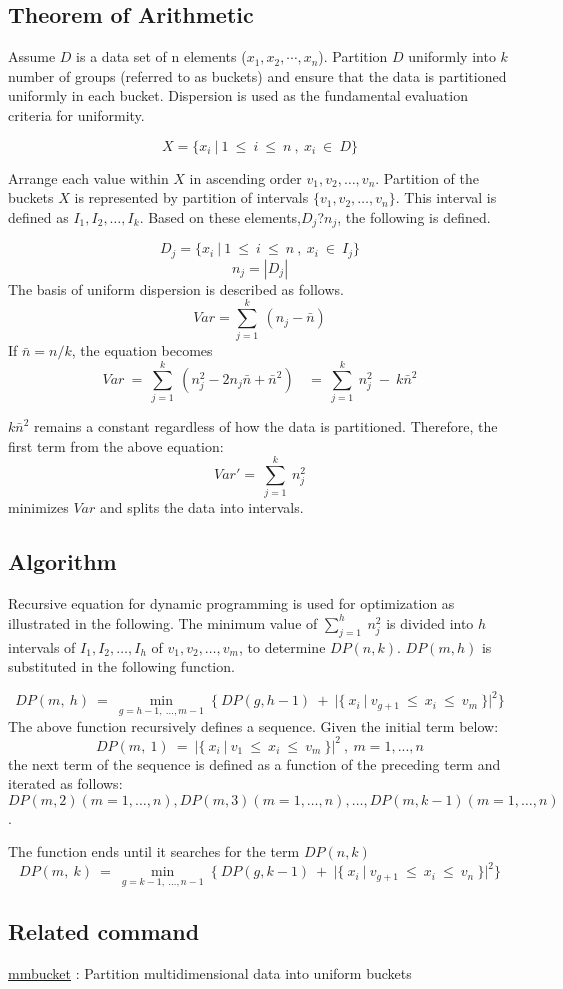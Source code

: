 \subsection*{Theorem of Arithmetic}

Assume $D$ is a data set of n elements ($x_1,x_2,\cdots,x_n$).
Partition $D$ uniformly into $k$ number of groups (referred to as buckets) and ensure that the data is partitioned uniformly in each bucket. Dispersion is used as the fundamental evaluation criteria for uniformity.

\[
X=\{x_i~|~1~\leq~i~\leq~n~,~x_i~\in~D\}
\]

Arrange each value within $X$ in  ascending order $v_1,v_2,\dots,v_n$.
Partition of the buckets $X$ is represented by partition of intervals  $\{v_1,v_2,\dots,v_n\}$.
This interval is defined as $I_1,I_2,\dots,I_k$. Based on these elements,$D_j$?$n_j$, the following is defined.

\[
 D_j=\{x_i~|~1~\leq~i~\leq~n~,~x_i~\in~I_j\}
  \]
  \[
 n_j=|D_j|
 \]
The basis of uniform dispersion is described as follows. \\
\[
Var=\sum_{j=1}^{k}~(n_j-\bar{n})
\]
If $\bar{n}=n/k$, the equation becomes\\
\[
Var~=~\sum_{j=1}^{k}~(n_j^2-2n_j\bar{n}+\bar{n}^2)~~~~=~\sum_{j=1}^{k}~n_j^2~-~k\bar{n}^2
\]

$k\bar{n}^2$ remains a constant regardless of how the data is partitioned. Therefore, the first term from the above equation:  
\[
Var'=~\sum_{j=1}^{k}~n_j^2
\]
minimizes $Var$ and splits the data into intervals. 


\subsection*{Algorithm}

Recursive equation for dynamic programming is used for optimization as illustrated in the following. 
The minimum value of $\displaystyle \sum_{j=1}^{h}~n_j^2$
is divided into $h$ intervals of $I_1,I_2,\dots,I_h$  of $v_1,v_2,\dots,v_m$, to determine  $DP(n,k)$. 
 $DP(m,h)$ is substituted in the following function.

\[
DP(m,~h)~=~\min_{g=h-1,~\dots,m-1}~\{~DP(g,h-1)~+~|\{~x_i~|~v_{g+1}~\leq~x_i~\leq~v_m~\}|^2\}
\]
The above function recursively defines a sequence. Given the initial term below: 
\[
DP(m,~1)~=~|\{~x_i~|~v_1~\leq~x_i~\leq~v_m~\}|^2~,~m=1,...,n
\]
the next term of the sequence is defined as a function of the preceding term and iterated as follows:
$DP(m,2)(m=1,\dots,n),DP(m,3)(m=1,\dots,n),\dots,DP(m,k-1)(m=1,\dots,n)$.

The function ends until it searches for the term $DP(n,k)$
\[
DP(m,~k)~=~\min_{g=k-1,~\dots,n-1}~\{~DP(g,k-1)~+~|\{~x_i~|~v_{g+1}~\leq~x_i~\leq~v_n~\}|^2\}
\]

\subsection*{Related command}
\hyperref[sect:mmbucket]{mmbucket} : Partition multidimensional data into uniform buckets \\


